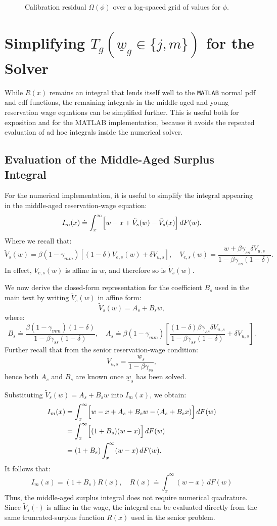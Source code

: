 \documentclass{article}
\newcommand{\lbar}[1]{\underline{#1}} %
\begin{document}
\begin{figure}[!ht]
\centering

\caption{Calibration residual $\Omega(\phi)$ over a log-spaced grid of values for $\phi$.}
\label{fig:calibration_residual}
\end{figure}

\section{\texorpdfstring{Simplifying $T_g(\lbar{w}_g\in\{j,m\})$ for the Solver}{Simplifying T_g for the Solver}}
\label{app:solver_simplification}
While $R(x)$ remains an integral that lends itself well to the \texttt{MATLAB} normal pdf and cdf functions, the remaining integrals in the middle-aged and young reservation wage equations can be simplified further. This is useful both for exposition and for the MATLAB implementation, because it avoids the repeated evaluation of ad hoc integrals inside the numerical solver.

\subsection{Evaluation of the Middle-Aged Surplus Integral}
\label{app:middle_surplus}

For the numerical implementation, it is useful to simplify the integral appearing in the middle-aged reservation-wage equation:
\[
I_m(x)
\doteq
\int_x^\infty
\Bigl[
w-x+\tilde V_s(w)-\tilde V_s(x)
\Bigr]\,dF(w).
\]
Where we recall that:
\[
\tilde V_s(w)=
\beta(1-\gamma_{mm})
\left[
(1-\delta)V_{e,s}(w)+\delta V_{u,s}
\right],\quad
V_{e,s}(w)=
\frac{
w+\beta\gamma_{ss}\delta V_{u,s}
}{
1-\beta\gamma_{ss}(1-\delta)
}.
\]
In effect, $V_{e,s}(w)$ is affine in $w$, and therefore so is
$\tilde{V}_s(w)$.
\par\smallskip
\noindent We now derive the closed-form representation for the coefficient $B_s$ used in the main text by writing $\tilde{V}_s(w)$ in affine form:
\[
\tilde V_s(w)=A_s+B_s w,
\]
where:
\[
B_s
\doteq
\frac{\beta(1-\gamma_{mm})(1-\delta)}{1-\beta\gamma_{ss}(1-\delta)},\quad
A_s
\doteq
\beta(1-\gamma_{mm})
\left[
\frac{(1-\delta)\beta\gamma_{ss}\delta V_{u,s}}{1-\beta\gamma_{ss}(1-\delta)}
+\delta V_{u,s}
\right].
\]
Further recall that from the senior reservation-wage condition:
\[
V_{u,s}
=
\frac{\underline w_s}{1-\beta\gamma_{ss}},
\]
hence both $A_s$ and $B_s$ are known once $\underline w_s$ has been solved.
\par\smallskip
\noindent Substituting $\tilde V_s(w)=A_s+B_s w$ into $I_m(x)$, we obtain:
\begin{align*}
I_m(x)
&=
\int_x^\infty
\Bigl[
w-x+A_s+B_s w-(A_s+B_s x)
\Bigr]\,dF(w)\\
&=
\int_x^\infty
\Bigl[
(1+B_s)(w-x)
\Bigr]\,dF(w)\\
&=
(1+B_s)
\int_x^\infty (w-x)\,dF(w).
\end{align*}
It follows that:
\[
I_m(x)
=
(1+B_s)R(x), \quad R(x)
\doteq
\int_x^\infty (w-x)\,dF(w)
\]
Thus, the middle-aged surplus integral does not require numerical quadrature. Since $\tilde V_s(\cdot)$ is affine in the wage, the integral can be evaluated directly from the same truncated-surplus function $R(x)$ used in the senior problem.
\end{document}
